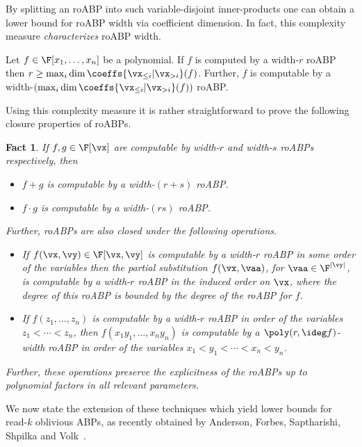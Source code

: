 \documentclass[11pt]{article}
\numberwithin{equation}{section}
\newtheorem{fact}[theorem]{Fact}
\theoremstyle{definition}
\theoremstyle{plain}
\begin{document}
By splitting an roABP into such variable-disjoint inner-products one can obtain a lower bound for roABP width via coefficient dimension.  In fact, this complexity measure \emph{characterizes} roABP width.

\begin{lemmawp}\label{res:roABP-width_eq_dim-coeffs}
        Let $f\in\F[x_1,\ldots,x_n]$ be a polynomial. If $f$ is computed by a width-$r$ roABP then $r \ge \max_i\dim\coeffs{\vx_{\le i}|\vx_{>i}}(f)$. Further, $f$ is computable by a width-$\left(\max_i\dim\coeffs{\vx_{\le i}|\vx_{>i}}(f)\right)$ roABP.
\end{lemmawp}

Using this complexity measure it is rather straightforward to prove the following closure properties of roABPs.

\begin{fact}\label{fact:roABP:closure}
        If $f,g\in\F[\vx]$ are computable by width-$r$ and width-$s$ roABPs respectively, then
        \begin{itemize}
                \item $f+g$ is computable by a width-$(r+s)$ roABP\@.
                \item $f\cdot g$ is computable by a width-$(rs)$ roABP\@.
        \end{itemize}

        \noindent Further, roABPs are also closed under the following operations.
        \begin{itemize}
                \item If $f(\vx,\vy)\in\F[\vx,\vy]$ is computable by a width-$r$ roABP in some order of the variables then the partial substitution $f(\vx,\vaa)$, for $\vaa\in\F^{|\vy|}$, is computable by a width-$r$ roABP in the induced order on $\vx$, where the degree of this roABP is bounded by the degree of the roABP for $f$.
                \item If $f(z_1,\ldots,z_n)$ is computable by a width-$r$ roABP in order of the variables $z_1<\cdots<z_n$, then $f(x_1y_1,\ldots,x_ny_n)$ is computable by a $\poly(r,\ideg f)$-width roABP in order of the variables $x_1<y_1<\cdots<x_n<y_n$.
        \end{itemize}
        Further, these operations preserve the explicitness of the roABPs up to polynomial factors in all relevant parameters.
\end{fact}
%

We now state the extension of these techniques which yield lower bounds for read-$k$ oblivious ABPs, as recently obtained by Anderson, Forbes, Saptharishi, Shpilka and Volk~\cite{AndersonFSSV16}.
\end{document}
